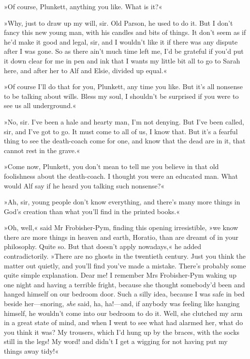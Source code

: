 »Of course, Plunkett, anything you like. What is it?«

»Why, just to draw up my will, sir. Old Parson, he used to do it. But I don't fancy this new young man, with his candles and bits of things. It don't seem as if he'd make it good and legal, sir, and I wouldn't like it if there was any dispute after I was gone. So as there ain't much time left me, I'd be grateful if you'd put it down clear for me in pen and ink that I wants my little bit all to go to Sarah here, and after her to Alf and Elsie, divided up equal.«

»Of course I'll do that for you, Plunkett, any time you like. But it's all nonsense to be talking about wills. Bless my soul, I shouldn't be surprised if you were to see us all underground.«

»No, sir. I've been a hale and hearty man, I'm not denying. But I've been called, sir, and I've got to go. It must come to all of us, I know that. But it's a fearful thing to see the death-coach come for one, and know that the dead are in it, that cannot rest in the grave.«

»Come now, Plunkett, you don't mean to tell me you believe in that old foolishness about the death-coach. I thought you were an educated man. What would Alf say if he heard you talking such nonsense?«

»Ah, sir, young people don't know everything, and there's many more things in God's creation than what you'll find in the printed books.«

»Oh, well,« said Mr Frobisher-Pym, finding this opening irresistible, »we know there are more things in heaven and earth, Horatio, than are dreamt of in your philosophy. Quite so. But that doesn't apply nowadays,« he added contradictorily. »There are no ghosts in the twentieth century. Just you think the matter out quietly, and you'll find you've made a mistake. There's probably some quite simple explanation. Dear me! I remember Mrs Frobisher-Pym waking up one night and having a terrible fright, because she thought somebody'd been and hanged himself on our bedroom door. Such a silly idea, because I was safe in bed beside her—snoring, \textit{she} said, ha, ha!—and, if anybody was feeling like hanging himself, he wouldn't come into our bedroom to do it. Well, she clutched my arm in a great state of mind, and when I went to see what had alarmed her, what do you think it was? My trousers, which I'd hung up by the braces, with the socks still in the legs! My word! and didn't I get a wigging for not having put my things away tidy!«

